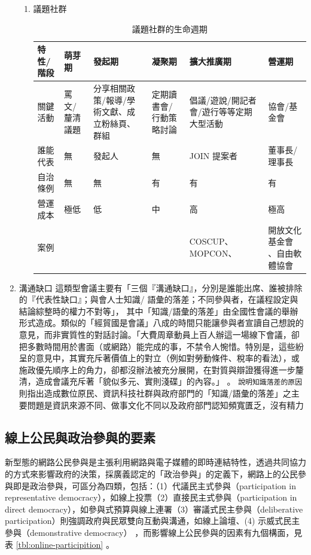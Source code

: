 \documentclass[12pt,a4paper]{article}
\begin{document}
\begin{enumerate}
\begin{enumerate}
\item 議題社群
\label{sec:org334c8be}
\begin{table}[htbp]
\caption{\label{tab:org5157f33}
議題社群的生命週期}
\centering
{} \footnotesize \setlength{\tabcolsep}{3pt}
\begin{tabular}{llp{80pt}p{80pt}p{80pt}p{80pt}}
\toprule
特性/階段 & 萌芽期 & 發起期 & 凝聚期 & 擴大推廣期 & 營運期\\
\midrule
關鍵活動 & 罵文/釐清議題 & 分享相關政策/報導/學術文獻、成立粉絲頁、群組 & 定期讀書會/行動策略討論 & 倡議/遊說/開記者會/遊行等等定期大型活動 & 協會/基金會\\
誰能代表 & 無 & 發起人 & 無 & JOIN 提案者 & 董事長/理事長\\
自治條例 & 無 & 無 & 有 & 有 & 有\\
營運成本 & 極低 & 低 & 中 & 高 & 極高\\
案例 &  &  &  & COSCUP、MOPCON、 & 開放文化基金會 、自由軟體協會\\
\bottomrule
\end{tabular}
\end{table}
\end{enumerate}
\item 溝通缺口
\label{sec:org721a394}
這類型會議主要有「三個『溝通缺口』，分別是誰能出席、誰被排除的『代表性缺口』；與會人士知識/ 語彙的落差；不同參與者，在議程設定與結論綜整時的權力不對等」\citep*{alberttzeng08}，
其中「知識/語彙的落差」由全國性會議的舉辦形式造成。類似的「經貿國是會議」八成的時間只能讓參與者宣讀自己想說的意見，而非實質性的對話討論。「大費周章動員上百人辦這一場線下會議，卻把多數時間用於書面（或網路）能完成的事，不禁令人惋惜。特別是，這些紛呈的意見中，其實充斥著價值上的對立（例如對勞動條件、稅率的看法），或施政優先順序上的角力，卻都沒辦法被充分展開，在對質與辯證獲得進一步釐清，造成會議充斥著「貌似多元、實則淺碟」的內容。」\citep*{albert2014} 。
\texttt{說明知識落差的原因}
則指出造成數位原民、資訊科技社群與政府部門的「知識/語彙的落差」之主要問題是資訊來源不同、做事文化不同以及政府部門認知頻寬匱乏，沒有精力
\end{enumerate}
\subsection{線上公民與政治參與的要素}
\label{sec:org6ad266a}
新型態的網路公民參與是主張利用網路與電子媒體的即時連結特性，透過共同協力的方式來影響政府的決策，採廣義認定的「政治參與」的定義下，網路上的公民參與即是政治參與，可區分為四類，包括：（1）代議民主式參與（participation  in  representative  democracy），如線上投票（2）直接民主式參與（participation  in  direct  democracy），如參與式預算與線上連署（3）審議式民主參與（deliberative participation）則強調政府與民眾雙向互動與溝通，如線上論壇、(4) 示威式民主參與（demonstrative democracy）\citep*{chen16} ，而影響線上公民參與的因素有九個構面，見表 \ref{tbl:online-participition} 。
\end{document}
